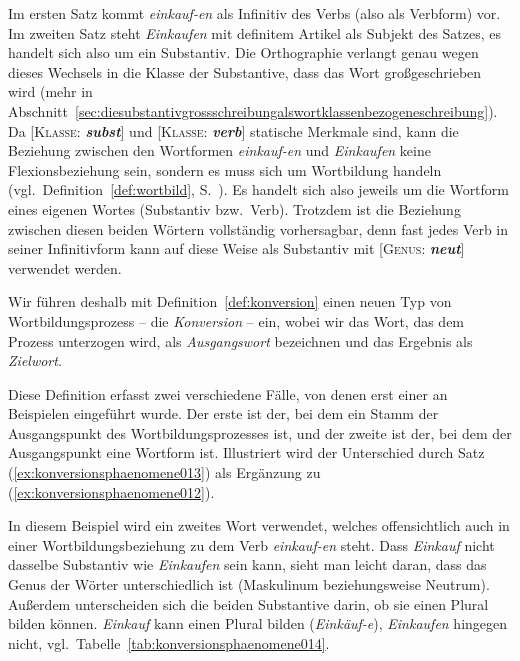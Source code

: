 Im ersten Satz kommt \textit{einkauf-en} als Infinitiv des Verbs (also als Verbform) vor.
Im zweiten Satz steht \textit{Einkaufen} mit definitem Artikel als Subjekt des Satzes, es handelt sich also um ein Substantiv.
Die Orthographie verlangt genau wegen dieses Wechsels in die Klasse der Substantive, dass das Wort großgeschrieben wird (mehr in Abschnitt~\ref{sec:diesubstantivgrossschreibungalswortklassenbezogeneschreibung}).
Da [\textsc{Klasse}: \textit{\textbf{subst}}] und [\textsc{Klasse}: \textit{\textbf{verb}}] statische Merkmale sind, kann die Beziehung zwischen den Wortformen \textit{einkauf-en} und \textit{Einkaufen} keine Flexionsbeziehung sein, sondern es muss sich um Wortbildung handeln (vgl.\ Definition~\ref{def:wortbild}, S.~\pageref{def:wortbild}).
Es handelt sich also jeweils um die Wortform eines eigenen Wortes (Substantiv bzw.\ Verb).
Trotzdem ist die Beziehung zwischen diesen beiden Wörtern vollständig vorhersagbar, denn fast jedes Verb in seiner Infinitivform kann auf diese Weise als Substantiv mit [\textsc{Genus}: \textit{\textbf{neut}}] verwendet werden.

Wir führen deshalb mit Definition~\ref{def:konversion} einen neuen Typ von Wortbildungsprozess -- die \textit{Konversion} -- ein, wobei wir das Wort, das dem Prozess unterzogen wird, als \textit{Ausgangswort} bezeichnen und das Ergebnis als \textit{Zielwort}.


Diese Definition erfasst zwei verschiedene Fälle, von denen erst einer an Beispielen eingeführt wurde.
Der erste ist der, bei dem ein Stamm der Ausgangspunkt des Wortbildungsprozesses ist, und der zweite ist der, bei dem der Ausgangspunkt eine Wortform ist.
Illustriert wird der Unterschied durch Satz (\ref{ex:konversionsphaenomene013}) als Ergänzung zu (\ref{ex:konversionsphaenomene012}).

\begin{exe}
\end{exe}

In diesem Beispiel wird ein zweites Wort verwendet, welches offensichtlich auch in einer Wortbildungsbeziehung zu dem Verb \textit{einkauf-en} steht.
Dass \textit{Einkauf} nicht dasselbe Substantiv wie \textit{Einkaufen} sein kann, sieht man leicht daran, dass das Genus der Wörter unterschiedlich ist (Maskulinum beziehungsweise Neutrum).
Außerdem unterscheiden sich die beiden Substantive darin, ob sie einen Plural bilden können.
\textit{Einkauf} kann einen Plural bilden (\textit{Einkäuf-e}), \textit{Einkaufen} hingegen nicht, vgl.\ Tabelle~\ref{tab:konversionsphaenomene014}.

